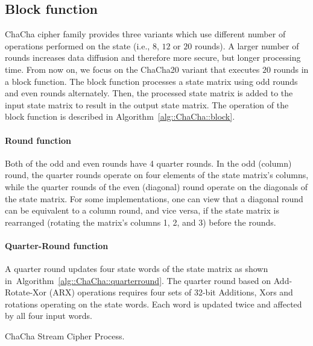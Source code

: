 \subsection{Block function}
ChaCha cipher family provides three variants which use different number
of operations performed on the state (i.e., $8$, $12$ or $20$ rounds). 
A larger number of rounds increases data diffusion and therefore more secure, but longer processing time. 
From now on, we focus on the ChaCha20 variant that executes $20$ rounds in a block function.
The block function processes a state matrix using odd rounds and even rounds alternately. 
Then, the processed state matrix is added to the input state matrix to result in the output state matrix. 
The operation of the block function is described in Algorithm~\ref{alg::ChaCha::block}.

\paragraph{Round function} Both of the odd and even rounds have 4 quarter rounds.
In the odd (column) round, the quarter rounds operate on four elements of the state matrix's columns,
while the quarter rounds of the even (diagonal) round operate on the diagonals of the state matrix.
For some implementations, one can view that a diagonal round can be equivalent to a column round, and vice versa, if the state matrix is rearranged (rotating the matrix's columns 1, 2, and 3) before the rounds. 

\paragraph{Quarter-Round function} A quarter round updates four state words of the state matrix as shown in~Algorithm~\ref{alg::ChaCha::quarterround}. 
The quarter round based on Add-Rotate-Xor (ARX) operations requires four sets of 32-bit Additions, Xors and  rotations operating on the state words. 
Each word is updated twice and affected by all four input words.

\begin{algorithm}
	\BlankLine
	\caption{ChaCha Stream Cipher Process.}
	\label{alg::ChaCha::process}
\end{algorithm}


